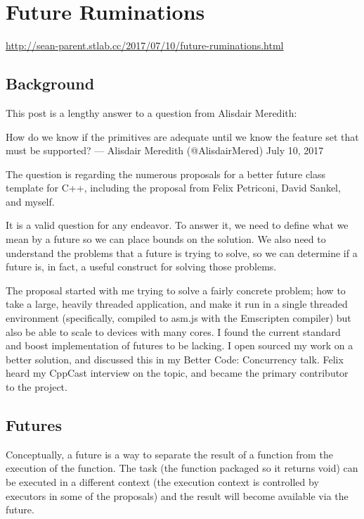 \section{Future Ruminations}

\centerline{\url{http://sean-parent.stlab.cc/2017/07/10/future-ruminations.html}}

\subsection{Background}

This post is a lengthy answer to a question from Alisdair Meredith:

How do we know if the primitives are adequate until we know the feature set that must be supported?
— Alisdair Meredith (@AlisdairMered) July 10, 2017

The question is regarding the numerous proposals for a better future class template for C++, including the proposal from Felix Petriconi, David Sankel, and myself.

It is a valid question for any endeavor. To answer it, we need to define what we mean by a future so we can place bounds on the solution. We also need to understand the problems that a future is trying to solve, so we can determine if a future is, in fact, a useful construct for solving those problems.

The proposal started with me trying to solve a fairly concrete problem; how to take a large, heavily threaded application, and make it run in a single threaded environment (specifically, compiled to asm.js with the Emscripten compiler) but also be able to scale to devices with many cores. I found the current standard and boost implementation of futures to be lacking. I open sourced my work on a better solution, and discussed this in my Better Code: Concurrency talk. Felix heard my CppCast interview on the topic, and became the primary contributor to the project.

\subsection{Futures}

Conceptually, a future is a way to separate the result of a function from the execution of the function. The task (the function packaged so it returns void) can be executed in a different context (the execution context is controlled by executors in some of the proposals) and the result will become available via the future.

